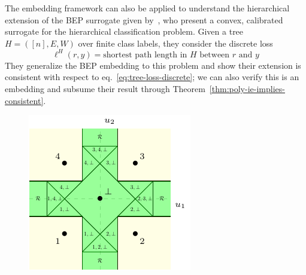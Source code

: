 \documentclass[11pt]{article}
\begin{document}
The embedding framework can also be applied to understand the hierarchical extension of the BEP surrogate given by~\citet{ramaswamy2015hierarchical}, who present a convex, calibrated surrogate for the hierarchical classification problem.
Given a tree $H = ([n], E,W)$ over finite class labels, they consider the discrete loss 
\begin{equation}\label{eq:tree-loss-discrete}
	\ell^H(r,y) = \text{shortest path length in $H$ between $r$ and $y$}
\end{equation}
They generalize the BEP embedding to this problem and show their extension is consistent with respect to eq.~\eqref{eq:tree-loss-discrete}; we can also verify this is an embedding and subsume their result through Theorem~\ref{thm:poly-ie-implies-consistent}.


\begin{figure}
\begin{center}
\begin{minipage}{0.32\linewidth}
\includegraphics[width=\linewidth]{tikz/abstain-link-linf.pdf}
\end{minipage}\hfill
\begin{minipage}{0.32\linewidth}

\end{minipage}
\end{center}
\end{figure}
\end{document}
